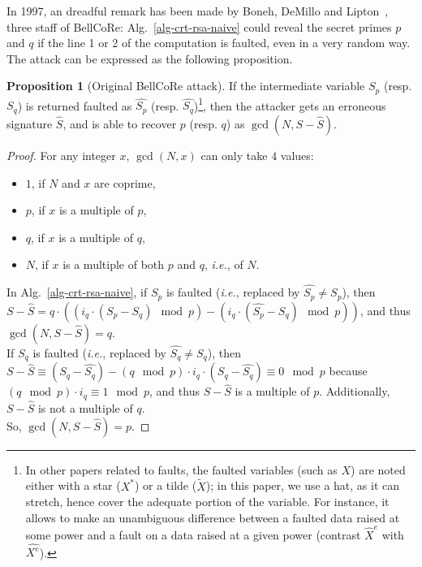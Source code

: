 \documentclass[10pt]{article}
\theoremstyle{definition}
\theoremstyle{theorem}
\newtheorem{proposition}{Proposition}
\newcommand{\ie}{\textit{i.e.}}
\begin{document}
In 1997, an dreadful remark has been made by Boneh, DeMillo and Lipton~\cite{boneh-fault}, three staff of BellCoRe:
Alg.~\ref{alg-crt-rsa-naive} could reveal the secret primes $p$ and $q$ if the line 1 or 2 of the computation is faulted, even in a very random way.
The attack can be expressed as the following proposition.
\begin{proposition}[Original BellCoRe attack]
If the intermediate variable $S_p$ (resp. $S_q$) is returned faulted as $\widehat{S_p}$ (resp. $\widehat{S_q}$)\footnote{In other papers related to faults, the faulted variables (such as $X$) are noted either with a star ($X^*$) or a tilde ($\tilde{X}$); in this paper, we use a hat, as it can stretch, hence cover the adequate portion of the variable. For instance, it allows to make an unambiguous difference between a faulted data raised at some power and a fault on a data raised at a given power (contrast $\widehat{X}^e$ with $\widehat{X^e}$).},
then the attacker gets an erroneous signature $\widehat{S}$,
and is able to recover $p$ (resp. $q$) as $\gcd(N, S-\widehat{S})$.
\label{pro-bellcore2faults}
\end{proposition}
\begin{proof}
For any integer $x$, $\gcd(N, x)$ can only take $4$ values:
\begin{itemize}
\item $1$, if $N$ and $x$ are coprime,
\item $p$, if $x$ is a multiple of $p$,
\item $q$, if $x$ is a multiple of $q$,
\item $N$, if $x$ is a multiple of both $p$ and $q$, \ie, of $N$.
\end{itemize}
In Alg.~\ref{alg-crt-rsa-naive}, if $S_p$ is faulted (\ie, replaced by $\widehat{S_p} \neq S_p$), then\\
$S-\widehat{S} = q \cdot (( i_q \cdot (S_p-S_q)\mod p) - ( i_q \cdot (\widehat{S_p}-S_q) \mod p))$,
and thus $\gcd(N, S-\widehat{S}) = q$.\\
If $S_q$ is faulted (\ie, replaced by $\widehat{S_q} \neq S_q$), then\\
$S-\widehat{S} \equiv (S_q - \widehat{S_q}) - ( q \mod p) \cdot i_q \cdot (S_q - \widehat{S_q}) \equiv 0 \mod p$ because $(q \mod p) \cdot i_q \equiv 1 \mod p$, and thus $S-\widehat{S}$ is a multiple of $p$.
Additionally, $S-\widehat{S}$ is not a multiple of $q$.\\
So, $\gcd(N, S-\widehat{S})=p$.
\end{proof}
\end{document}
